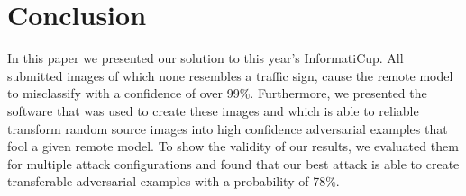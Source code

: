 \section{Conclusion}

In this paper we presented our solution to this year's InformatiCup. All submitted images of which none resembles a traffic sign, cause the remote model to misclassify with a confidence of over 99\%. Furthermore, we presented the software that was used to create these images and which is able to reliable transform random source images into high confidence adversarial examples that fool a given remote model. To show the validity of our results, we evaluated them for multiple attack configurations and found that our best attack is able to create transferable adversarial examples with a probability of 78\%.